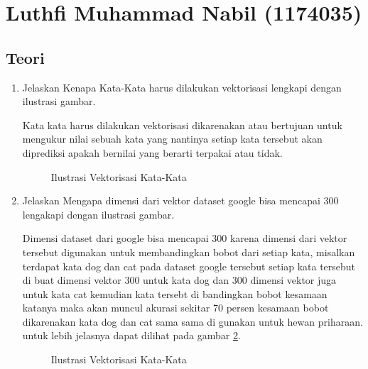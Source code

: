 \section{Luthfi Muhammad Nabil (1174035)}
\subsection{Teori}
\begin{enumerate}

\item Jelaskan Kenapa Kata-Kata harus dilakukan vektorisasi lengkapi dengan ilustrasi gambar.\par
Kata kata harus dilakukan vektorisasi dikarenakan atau bertujuan untuk mengukur nilai sebuah kata yang nantinya setiap kata tersebut akan diprediksi apakah bernilai yang berarti terpakai atau tidak.

\begin{figure}[!htbp]
        \caption{Ilustrasi Vektorisasi Kata-Kata}
        \label{1}
        \end{figure}

\item Jelaskan Mengapa dimensi dari vektor dataset google bisa mencapai 300 lengakapi dengan ilustrasi gambar. \par
Dimensi dataset dari google bisa mencapai 300 karena dimensi dari vektor tersebut digunakan untuk membandingkan bobot dari setiap kata, misalkan terdapat kata dog dan cat pada dataset google tersebut setiap kata tersebut di buat dimensi vektor 300 untuk kata dog dan 300 dimensi vektor juga untuk kata cat kemudian kata tersebt di bandingkan bobot kesamaan katanya maka akan muncul akurasi sekitar 70 persen kesamaan bobot dikarenakan kata dog dan cat sama sama di gunakan untuk hewan priharaan. untuk lebih jelasnya dapat dilihat pada gambar \ref{2}.

\begin{figure}[!htbp]
    \caption{Ilustrasi Vektorisasi Kata-Kata}
    \label{2}
    \end{figure}


\end{enumerate}
